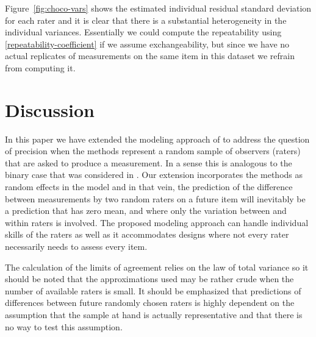 \documentclass[aoas]{imsart}
\begin{document}
Figure~\ref{fig:choco-vars} shows the estimated individual residual
standard deviation for each rater and it is clear that there is a
substantial heterogeneity in the individual variances. Essentially we
could compute the repeatability using
\eqref{repeatability-coefficient} if we assume exchangeability, but
since we have no actual replicates of measurements on the same item in
this dataset we refrain from computing it.




\section{Discussion}

In this paper we have extended the modeling approach of
\citet{Carstensen.2008b} to address the question of precision when the
methods represent a random sample of observers (raters) that are asked
to produce a measurement. In a sense this is analogous to the binary
case that was considered in \citet{fleiss:etal:2004}.  Our extension
incorporates the methods as random effects in the model and in that
vein, the prediction of the difference between measurements by two
random raters on a future item will inevitably be a prediction that
has zero mean, and where only the variation between and within raters
is involved. The proposed modeling approach can handle individual
skills of the raters as well as it accommodates designs where not
every rater necessarily needs to assess every item.

The calculation of the limits of agreement relies on the law of total
variance so it should be noted that the approximations used may be
rather crude when the number of available raters is small. It should
be emphasized that predictions of differences between future randomly
chosen raters is highly dependent on the assumption that the sample at
hand is actually representative and that there is no way to test this
assumption.
\end{document}
